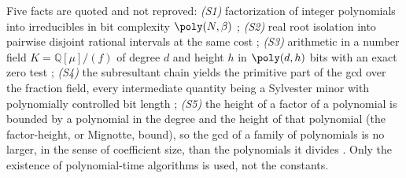 Five facts are quoted and not reproved: \emph{(S1)} factorization of integer polynomials into
irreducibles in bit complexity $\poly(N,\beta)$ \cite{vzgg03}; \emph{(S2)} real root isolation into
pairwise disjoint rational intervals at the same cost \cite{bpr06}; \emph{(S3)} arithmetic in a number
field $K=\mathbb{Q}[\mu]/(f)$ of degree $d$ and height $h$ in $\poly(d,h)$ bits with an exact zero
test \cite{lan02,vzgg03}; \emph{(S4)} the subresultant chain yields the primitive part of the gcd over
the fraction field, every intermediate quantity being a Sylvester minor with polynomially controlled
bit length \cite{vzgg03}; \emph{(S5)} the height of a factor of a polynomial is bounded by a polynomial
in the degree and the height of that polynomial (the factor-height, or Mignotte, bound), so the gcd of
a family of polynomials is no larger, in the sense of coefficient size, than the polynomials it divides
\cite{vzgg03,lan02}. Only the existence of polynomial-time algorithms is used, not the constants.
